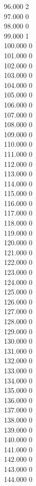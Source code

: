 { 96.000	2 \\
 97.000	0 \\
 98.000	0 \\
 99.000	1 \\
 100.000	0 \\
 101.000	0 \\
 102.000	0 \\
 103.000	0 \\
 104.000	0 \\
 105.000	0 \\
 106.000	0 \\
 107.000	0 \\
 108.000	0 \\
 109.000	0 \\
 110.000	0 \\
 111.000	0 \\
 112.000	0 \\
 113.000	0 \\
 114.000	0 \\
 115.000	0 \\
 116.000	0 \\
 117.000	0 \\
 118.000	0 \\
 119.000	0 \\
 120.000	0 \\
 121.000	0 \\
 122.000	0 \\
 123.000	0 \\
 124.000	0 \\
 125.000	0 \\
 126.000	0 \\
 127.000	0 \\
 128.000	0 \\
 129.000	0 \\
 130.000	0 \\
 131.000	0 \\
 132.000	0 \\
 133.000	0 \\
 134.000	0 \\
 135.000	0 \\
 136.000	0 \\
 137.000	0 \\
 138.000	0 \\
 139.000	0 \\
 140.000	0 \\
 141.000	0 \\
 142.000	0 \\
 143.000	0 \\
 144.000	0 \\
}
